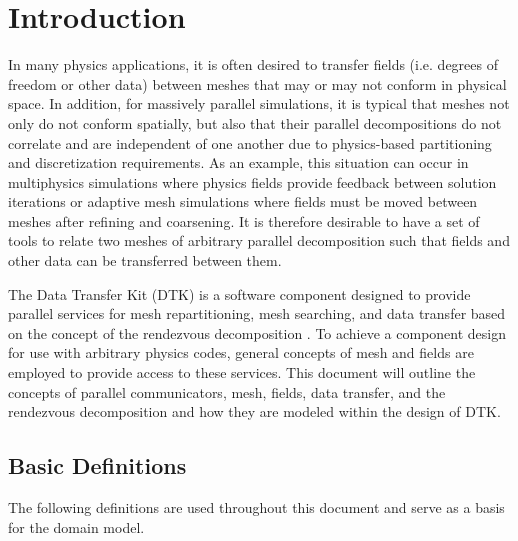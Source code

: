 \documentclass[letterpaper,12pt]{article}
\begin{document}
\section{Introduction}\label{sec:intro}
In many physics applications, it is often desired to transfer fields
(i.e. degrees of freedom or other data) between meshes that may or may
not conform in physical space. In addition, for massively parallel
simulations, it is typical that meshes not only do not conform
spatially, but also that their parallel decompositions do not
correlate and are independent of one another due to physics-based
partitioning and discretization requirements. As an example, this
situation can occur in multiphysics simulations where physics fields
provide feedback between solution iterations or adaptive mesh
simulations where fields must be moved between meshes after refining
and coarsening. It is therefore desirable to have a set of tools to
relate two meshes of arbitrary parallel decomposition such that fields
and other data can be transferred between them.

The Data Transfer Kit (DTK) is a software component designed to
provide parallel services for mesh repartitioning, mesh searching, and
data transfer based on the concept of the rendezvous decomposition
\cite{Plimpton_2004}. To achieve a component design for use with
arbitrary physics codes, general concepts of mesh and fields are
employed to provide access to these services. This document will
outline the concepts of parallel communicators, mesh, fields, data
transfer, and the rendezvous decomposition and how they are modeled
within the design of DTK.

\subsection{Basic Definitions}\label{subsec:basic_defs}

The following definitions are used throughout this document and serve
as a basis for the domain model.
\end{document}
